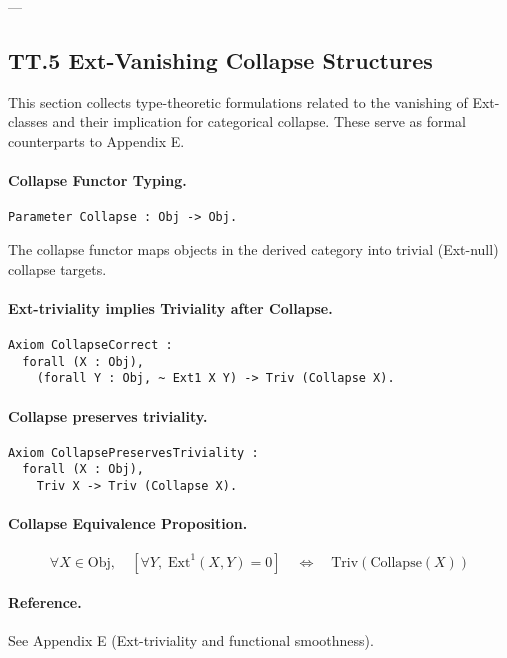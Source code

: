 \documentclass[11pt]{article}
\begin{document}
{---

\subsection*{TT.5 Ext-Vanishing Collapse Structures}

This section collects type-theoretic formulations related to the vanishing of Ext-classes  
and their implication for categorical collapse. These serve as formal counterparts to Appendix E.

\paragraph{Collapse Functor Typing.}
\begin{lstlisting}[language=Coq]
Parameter Collapse : Obj -> Obj.
\end{lstlisting}

The collapse functor maps objects in the derived category into trivial (Ext-null) collapse targets.

\paragraph{Ext-triviality implies Triviality after Collapse.}
\begin{lstlisting}[language=Coq]
Axiom CollapseCorrect :
  forall (X : Obj),
    (forall Y : Obj, ~ Ext1 X Y) -> Triv (Collapse X).
\end{lstlisting}

\paragraph{Collapse preserves triviality.}
\begin{lstlisting}[language=Coq]
Axiom CollapsePreservesTriviality :
  forall (X : Obj),
    Triv X -> Triv (Collapse X).
\end{lstlisting}

\paragraph{Collapse Equivalence Proposition.}
\[
\forall X \in \mathrm{Obj},\quad
\left[ \forall Y,\; \mathrm{Ext}^1(X,Y) = 0 \right]
\quad \Leftrightarrow \quad
\mathrm{Triv}(\mathrm{Collapse}(X))
\]

\paragraph{Reference.}
See Appendix E (Ext-triviality and functional smoothness).

}
\end{document}

